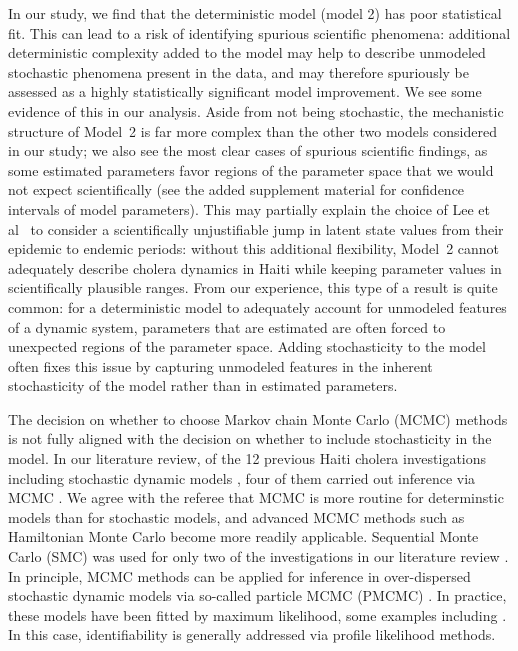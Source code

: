 \documentclass[11pt]{article}
\begin{document}
In our study, we find that the deterministic model (model 2) has poor statistical fit.
This can lead to a risk of identifying spurious scientific phenomena: additional deterministic complexity added to the model may help to describe unmodeled stochastic phenomena present in the data, and may therefore spuriously be assessed as a highly statistically significant model improvement.
We see some evidence of this in our analysis.
Aside from not being stochastic, the mechanistic structure of Model~2 is far more complex than the other two models considered in our study; we also see the most clear cases of spurious scientific findings, as some estimated parameters favor regions of the parameter space that we would not expect scientifically (see the added supplement material for confidence intervals of model parameters). 
This may partially explain the choice of Lee et al~\cite{lee20} to consider a scientifically unjustifiable jump in latent state values from their epidemic to endemic periods: without this additional flexibility, Model~2 cannot adequately describe cholera dynamics in Haiti while keeping parameter values in scientifically plausible ranges. 
From our experience, this type of a result is quite common: for a deterministic model to adequately account for unmodeled features of a dynamic system, parameters that are estimated are often forced to unexpected regions of the parameter space.
Adding stochasticity to the model often fixes this issue by capturing unmodeled features in the inherent stochasticity of the model rather than in estimated parameters. 

The decision on whether to choose Markov chain Monte Carlo (MCMC) methods is not fully aligned with the decision on whether to include stochasticity in the model.
In our literature review, of the 12 previous Haiti cholera investigations including stochastic dynamic models \cite{kirpich17,lee20,pasett018,mukandavire13,kirpich16,lewnard16,kunkel17,mukandavire15,sallah17,azman12,azman15}, four of them carried out inference via MCMC \cite{pasetto18,lewnard16,sallah17,azman12}.
We agree with the referee that MCMC is more routine for determinstic models than for stochastic models, and advanced MCMC methods such as Hamiltonian Monte Carlo become more readily applicable.
Sequential Monte Carlo (SMC) was used for only two of the investigations in our literature review \cite{lee20,azman15}.
In principle, MCMC methods can be applied for inference in over-dispersed stochastic dynamic models via so-called particle MCMC (PMCMC) \cite{andrieu10}.
In practice, these models have been fitted by maximum likelihood, some examples including \cite{lemaitre19,fox22,molodecky23,pons-salort18,subramanian20,stocks20}.
In this case, identifiability is generally addressed via profile likelihood methods.
\end{document}
